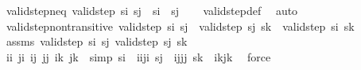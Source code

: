\begin{isabellebody}
%
\isadelimproof
\isanewline
%
\endisadelimproof
\isanewline
{}\isamarkupfalse%
\ valid{\isacharunderscore}{\kern0pt}step{\isacharunderscore}{\kern0pt}neq{\isacharcolon}{\kern0pt}\ {\isachardoublequoteopen}valid{\isacharunderscore}{\kern0pt}step\ s\isactrlsub i\ s\isactrlsub j\ {\isasymLongrightarrow}\ s\isactrlsub i\ {\isasymnoteq}\ s\isactrlsub j{\isachardoublequoteclose}\isanewline
%
\isadelimproof
\ \ %
\endisadelimproof
%
\isatagproof
{}\isamarkupfalse%
\ valid{\isacharunderscore}{\kern0pt}step{\isacharunderscore}{\kern0pt}def\ \isamarkupfalse%
\ auto%
\endisatagproof
{\isafoldproof}%
%
\isadelimproof
\isanewline
%
\endisadelimproof
\isanewline
{}\isamarkupfalse%
\ valid{\isacharunderscore}{\kern0pt}step{\isacharunderscore}{\kern0pt}non{\isacharunderscore}{\kern0pt}transitive{\isacharcolon}{\kern0pt}\ {\isachardoublequoteopen}valid{\isacharunderscore}{\kern0pt}step\ s\isactrlsub i\ s\isactrlsub j\ {\isasymLongrightarrow}\ valid{\isacharunderscore}{\kern0pt}step\ s\isactrlsub j\ s\isactrlsub k\ {\isasymLongrightarrow}\ {\isasymnot}valid{\isacharunderscore}{\kern0pt}step\ s\isactrlsub i\ s\isactrlsub k{\isachardoublequoteclose}\isanewline
%
\isadelimproof
%
\endisadelimproof
%
\isatagproof
{}\isamarkupfalse%
\ {\isacharminus}{\kern0pt}\isanewline
\ \ \isamarkupfalse%
\ assms{\isacharcolon}{\kern0pt}\ {\isachardoublequoteopen}valid{\isacharunderscore}{\kern0pt}step\ s\isactrlsub i\ s\isactrlsub j{\isachardoublequoteclose}\ {\isachardoublequoteopen}valid{\isacharunderscore}{\kern0pt}step\ s\isactrlsub j\ s\isactrlsub k{\isachardoublequoteclose}\isanewline
\ \ \isamarkupfalse%
\ i\isactrlsub i\ j\isactrlsub i\ i\isactrlsub j\ j\isactrlsub j\ i\isactrlsub k\ j\isactrlsub k\ \ {\isacharbrackleft}{\kern0pt}simp{\isacharbrackright}{\kern0pt}{\isacharcolon}{\kern0pt}\ {\isachardoublequoteopen}s\isactrlsub i\ {\isacharequal}{\kern0pt}\ {\isacharparenleft}{\kern0pt}i\isactrlsub i{\isacharcomma}{\kern0pt}j\isactrlsub i{\isacharparenright}{\kern0pt}{\isachardoublequoteclose}\ {\isachardoublequoteopen}s\isactrlsub j\ {\isacharequal}{\kern0pt}\ {\isacharparenleft}{\kern0pt}i\isactrlsub j{\isacharcomma}{\kern0pt}j\isactrlsub j{\isacharparenright}{\kern0pt}{\isachardoublequoteclose}\ {\isachardoublequoteopen}s\isactrlsub k\ {\isacharequal}{\kern0pt}\ {\isacharparenleft}{\kern0pt}i\isactrlsub k{\isacharcomma}{\kern0pt}j\isactrlsub k{\isacharparenright}{\kern0pt}{\isachardoublequoteclose}\ \isamarkupfalse%
\ force\isanewline

\end{isabellebody}

